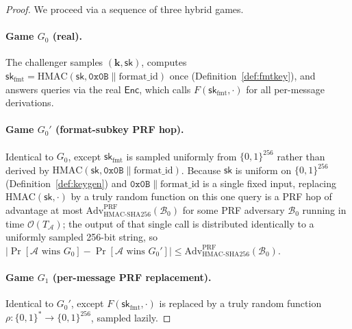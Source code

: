 \documentclass[11pt,a4paper]{article}
\begin{document}
\begin{proof}
We proceed via a sequence of three hybrid games.

\paragraph{Game $G_0$ (real).} The challenger samples $(\mathbf{k},\mathsf{sk})$,
computes
$\mathsf{sk}_{\mathrm{fmt}}=\mathrm{HMAC}(\mathsf{sk},\texttt{0x0B}\|\mathrm{format\_id})$
once (Definition~\ref{def:fmtkey}), and answers queries via the real
$\mathsf{Enc}$, which calls $F(\mathsf{sk}_{\mathrm{fmt}},\cdot)$ for all
per-message derivations.

\paragraph{Game $G_0'$ (format-subkey PRF hop).} Identical to $G_0$,
except $\mathsf{sk}_{\mathrm{fmt}}$ is sampled uniformly from
$\{0,1\}^{256}$ rather than derived by
$\mathrm{HMAC}(\mathsf{sk},\texttt{0x0B}\|\mathrm{format\_id})$. Because
$\mathsf{sk}$ is uniform on $\{0,1\}^{256}$
(Definition~\ref{def:keygen}) and $\texttt{0x0B}\|\mathrm{format\_id}$ is
a single fixed input, replacing $\mathrm{HMAC}(\mathsf{sk},\cdot)$ by a
truly random function on this one query is a PRF hop of advantage at
most $\mathrm{Adv}^{\mathrm{PRF}}_{\mathrm{HMAC\text{-}SHA256}}(\mathcal{B}_0)$
for some PRF adversary $\mathcal{B}_0$ running in time
$\mathcal{O}(T_\mathcal{A})$; the output of that single call is
distributed identically to a uniformly sampled 256-bit string, so
$|\Pr[\mathcal{A}\text{ wins }G_0] - \Pr[\mathcal{A}\text{ wins }G_0']| \le \mathrm{Adv}^{\mathrm{PRF}}_{\mathrm{HMAC\text{-}SHA256}}(\mathcal{B}_0)$.

\paragraph{Game $G_1$ (per-message PRF replacement).} Identical to
$G_0'$, except $F(\mathsf{sk}_{\mathrm{fmt}},\cdot)$ is replaced by a
truly random function $\rho:\{0,1\}^*\to\{0,1\}^{256}$, sampled lazily.


\end{proof}
\end{document}
